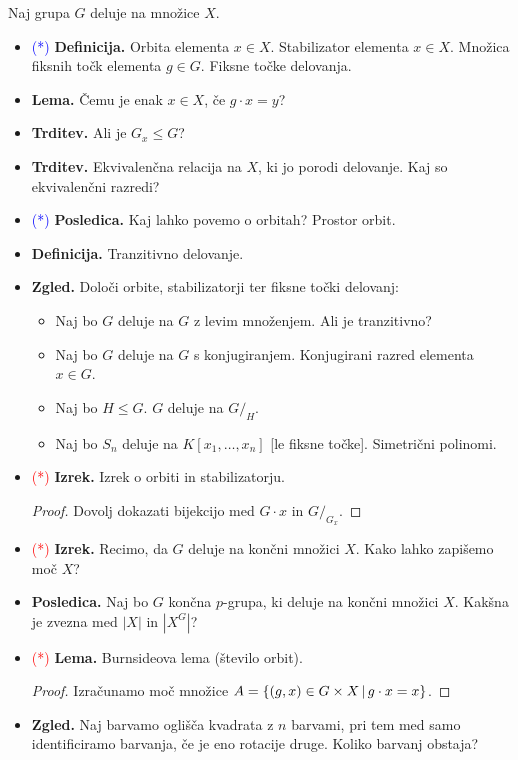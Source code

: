 \begin{enumerate}
    Naj grupa \(G\) deluje na množice \(X\).
    \begin{itemize}
        \item \textcolor{blue}{(*)} \textbf{Definicija.} Orbita elementa \(x \in X\). Stabilizator elementa \(x \in X\). Množica fiksnih točk elementa \(g \in G\). Fiksne točke delovanja.
        \item \textbf{Lema.} Čemu je enak \(x \in X\), če \(g \cdot x = y\)?
        \item \textbf{Trditev.} Ali je \(G_x \leq G\)?
        \item \textbf{Trditev.} Ekvivalenčna relacija na \(X\), ki jo porodi delovanje. Kaj so ekvivalenčni razredi?
        \item \textcolor{blue}{(*)} \textbf{Posledica.} Kaj lahko povemo o orbitah? Prostor orbit.
        \item \textbf{Definicija.} Tranzitivno delovanje.
        \item \textbf{Zgled.} Določi orbite, stabilizatorji ter fiksne točki delovanj:
        \begin{itemize}
            \item Naj bo \(G\) deluje na \(G\) z levim množenjem. Ali je tranzitivno?
            \item Naj bo \(G\) deluje na \(G\) s konjugiranjem. Konjugirani razred elementa \(x \in G\).
            \item Naj bo \(H \leq G\). \(G\) deluje na \(G/_H\).
            \item Naj bo \(S_n\) deluje na \(K[x_1, \ldots, x_n]\) [le fiksne točke]. Simetrični polinomi.
        \end{itemize}
        \item \textcolor{red}{(*)} \textbf{Izrek.} Izrek o orbiti in stabilizatorju.
        \begin{proof}
            Dovolj dokazati bijekcijo med \(G \cdot x\) in \(G/_{G_x}\).
        \end{proof}
        \item \textcolor{red}{(*)} \textbf{Izrek.} Recimo, da \(G\) deluje na končni množici \(X\). Kako lahko zapišemo moč \(X\)?
        \item \textbf{Posledica.} Naj bo \(G\) končna \(p\)-grupa, ki deluje na končni množici \(X\). Kakšna je zvezna med \(|X|\) in \(|X^G|\)?
        \newpage
        \item \textcolor{red}{(*)} \textbf{Lema.} Burnsideova lema (število orbit).
        \begin{proof}
            Izračunamo moč množice \(A = \{(g, x) \in G \times X \,|\, g \cdot x = x\}\).
        \end{proof}
        \item \textbf{Zgled.} Naj barvamo oglišča kvadrata z \(n\) barvami, pri tem med samo identificiramo barvanja, če je eno rotacije druge. Koliko barvanj obstaja?
    \end{itemize}


\end{enumerate}
